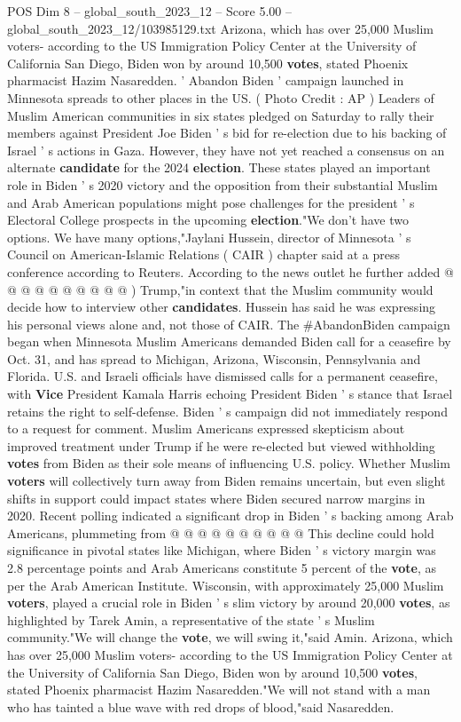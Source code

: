 \begin{textsample}{POS Dim 8 – global\_south\_2023\_12 – Score 5.00 – global\_south\_2023\_12/103985129.txt}  \label{ex:f8_pos_234}
Arizona, which has over 25,000 Muslim voters- according to the US Immigration Policy Center at the University of California San Diego, Biden won by around 10,500 \textbf{votes}, stated Phoenix pharmacist Hazim Nasaredden. ' Abandon Biden ' campaign launched in Minnesota spreads to other places in the US. ( Photo Credit : AP ) Leaders of Muslim American communities in six states pledged on Saturday to rally their members against President Joe Biden ' s bid for re-election due to his backing of Israel ' s actions in Gaza.
However, they have not yet reached a consensus on an alternate \textbf{candidate} for the 2024 \textbf{election}.
These states played an important role in Biden ' s 2020 victory and the opposition from their substantial Muslim and Arab American populations might pose challenges for the president ' s Electoral College prospects in the upcoming \textbf{election}."We don't have two options.
We have many options,"Jaylani Hussein, director of Minnesota ' s Council on American-Islamic Relations ( CAIR ) chapter said at a press conference according to Reuters.
According to the news outlet he further added @ @ @ @ @ @ @ @ @ @ ) Trump,"in context that the Muslim community would decide how to interview other \textbf{candidates}.
Hussein has said he was expressing his personal views alone and, not those of CAIR.
The \#AbandonBiden campaign began when Minnesota Muslim Americans demanded Biden call for a ceasefire by Oct. 31, and has spread to Michigan, Arizona, Wisconsin, Pennsylvania and Florida.
U.S. and Israeli officials have dismissed calls for a permanent ceasefire, with \textbf{Vice} President Kamala Harris echoing President Biden ' s stance that Israel retains the right to self-defense.
Biden ' s campaign did not immediately respond to a request for comment.
Muslim Americans expressed skepticism about improved treatment under Trump if he were re-elected but viewed withholding \textbf{votes} from Biden as their sole means of influencing U.S. policy.
Whether Muslim \textbf{voters} will collectively turn away from Biden remains uncertain, but even slight shifts in support could impact states where Biden secured narrow margins in 2020.
Recent polling indicated a significant drop in Biden ' s backing among Arab Americans, plummeting from @ @ @ @ @ @ @ @ @ @ This decline could hold significance in pivotal states like Michigan, where Biden ' s victory margin was 2.8 percentage points and Arab Americans constitute 5 percent of the \textbf{vote}, as per the Arab American Institute.
Wisconsin, with approximately 25,000 Muslim \textbf{voters}, played a crucial role in Biden ' s slim victory by around 20,000 \textbf{votes}, as highlighted by Tarek Amin, a representative of the state ' s Muslim community."We will change the \textbf{vote}, we will swing it,"said Amin.
Arizona, which has over 25,000 Muslim voters- according to the US Immigration Policy Center at the University of California San Diego, Biden won by around 10,500 \textbf{votes}, stated Phoenix pharmacist Hazim Nasaredden."We will not stand with a man who has tainted a blue wave with red drops of blood,"said Nasaredden.

\end{textsample}

